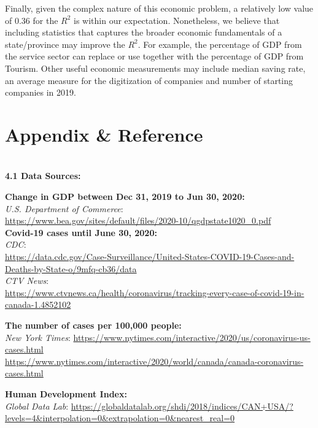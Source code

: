 \documentclass{article}
\begin{document}
Finally, given the complex nature of this economic problem, a relatively low value of 0.36 for the $R^2$ is within our expectation. Nonetheless, we believe that including statistics that captures the broader economic fundamentals of a state/province may improve the $R^2$. For example, the percentage of GDP from the service sector can replace or use together with the percentage of GDP from Tourism. Other useful economic measurements may include median saving rate, an average measure for the digitization of companies and number of starting companies in 2019. 





\maketitle
\newpage
\section{Appendix \& Reference}\\
\noindent\textbf {4.1 Data Sources:}

\noindent \textbf{Change in GDP between Dec 31, 2019 to Jun 30, 2020:}\\
\textit{U.S. Department of Commerce}:\\
\url{https://www.bea.gov/sites/default/files/2020-10/qgdpstate1020_0.pdf}\\
\noindent \textbf{Covid-19 cases until June 30, 2020:}\\
\textit{CDC}:\\
\url{https://data.cdc.gov/Case-Surveillance/United-States-COVID-19-Cases-and-Deaths-by-State-o/9mfq-cb36/data}\\
\textit{CTV News}:\\ \url{https://www.ctvnews.ca/health/coronavirus/tracking-every-case-of-covid-19-in-canada-1.4852102}

\noindent \textbf{The number of cases per 100,000 people:}\\
\textit{New York Times}:
\url{https://www.nytimes.com/interactive/2020/us/coronavirus-us-cases.html}\\
\url{https://www.nytimes.com/interactive/2020/world/canada/canada-coronavirus-cases.html}

\noindent \textbf{Human Development Index:}\\
\textit{Global Data Lab}:
\url{https://globaldatalab.org/shdi/2018/indices/CAN+USA/?levels=4&interpolation=0&extrapolation=0&nearest_real=0}
\end{document}

